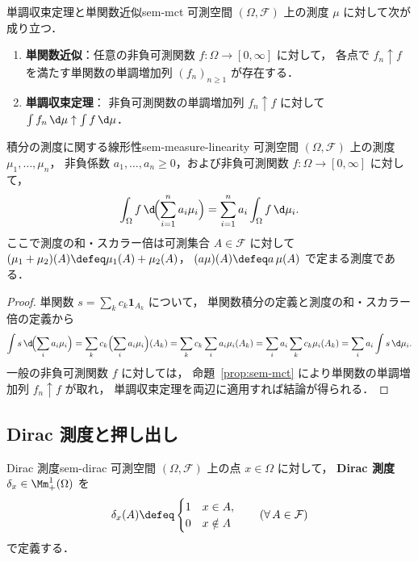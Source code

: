 \begin{proposition}{単調収束定理と単関数近似}{sem-mct}
  可測空間 $(\Omega, \mathcal{F})$ 上の測度 $\mu$ に対して次が成り立つ．
  \begin{enumerate}
    \item[(i)] \textbf{単関数近似}：任意の非負可測関数
      $f \colon \Omega \to [0, \infty]$ に対して，
      各点で $f_n \uparrow f$ を満たす単関数の単調増加列 $(f_n)_{n \geq 1}$ が存在する．
    \item[(ii)] \textbf{単調収束定理}：
      非負可測関数の単調増加列 $f_n \uparrow f$ に対して
      $\int f_n \, \d\mu \uparrow \int f \, \d\mu$．
  \end{enumerate}
\end{proposition}

\begin{proposition}{積分の測度に関する線形性}{sem-measure-linearity}
  可測空間 $(\Omega, \mathcal{F})$ 上の測度 $\mu_1, \ldots, \mu_n$，
  非負係数 $a_1, \ldots, a_n \geq 0$，および非負可測関数
  $f \colon \Omega \to [0, \infty]$ に対して，
  \[
    \int_\Omega f \, \d\!\Bigl(\sum_{i=1}^{n} a_i \mu_i\Bigr)
    = \sum_{i=1}^{n} a_i \int_\Omega f \, \d\mu_i.
  \]
  ここで測度の和・スカラー倍は可測集合 $A \in \mathcal{F}$ に対して
  $(\mu_1 + \mu_2)(A) \defeq \mu_1(A) + \mu_2(A)$，
  $(a\mu)(A) \defeq a\, \mu(A)$ で定まる測度である．
\end{proposition}

\begin{proof}
  単関数 $s = \sum_{k} c_k \mathbf{1}_{A_k}$ について，
  単関数積分の定義と測度の和・スカラー倍の定義から
  \[
    \int s \, \d\!\Bigl(\sum_i a_i \mu_i\Bigr)
    = \sum_k c_k \Bigl(\sum_i a_i \mu_i\Bigr)(A_k)
    = \sum_k c_k \sum_i a_i \mu_i(A_k)
    = \sum_i a_i \sum_k c_k \mu_i(A_k)
    = \sum_i a_i \int s \, \d\mu_i.
  \]
  一般の非負可測関数 $f$ に対しては，
  命題~\ref{prop:sem-mct} により単関数の単調増加列 $f_n \uparrow f$ が取れ，
  単調収束定理を両辺に適用すれば結論が得られる．
\end{proof}

\subsection{Dirac 測度と押し出し}
\label{sec:sem-dirac-pushforward}

\begin{definition}{Dirac 測度}{sem-dirac}
  可測空間 $(\Omega, \mathcal{F})$ 上の点 $x \in \Omega$ に対して，
  \textbf{Dirac 測度} $\delta_x \in \Mm_+^1(\Omega)$ を
  \[
    \delta_x(A) \defeq
    \begin{cases}
      1 & x \in A, \\
      0 & x \notin A
    \end{cases}
    \qquad (\forall\, A \in \mathcal{F})
  \]
  で定義する．
\end{definition}

